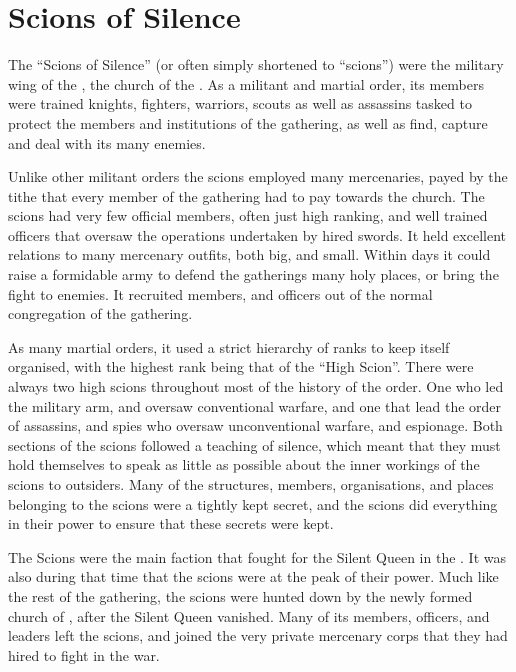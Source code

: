 \section{Scions of Silence}
\label{sec:Scions of Silence}

The ``Scions of Silence'' (or often simply shortened to ``scions'') were the
military wing of the , the church of the
. As a militant and martial order, its members were
trained knights, fighters, warriors, scouts as well as assassins tasked to
protect the members and institutions of the gathering, as well as find,
capture and deal with its many enemies.

Unlike other militant orders the scions employed many mercenaries, payed by
the tithe that every member of the gathering had to pay towards the church.
The scions had very few official members, often just high ranking, and well
trained officers that oversaw the operations undertaken by hired swords. It
held excellent relations to many mercenary outfits, both big, and
small. Within days it could raise a formidable army to defend the gatherings
many holy places, or bring the fight to enemies. It recruited members, and
officers out of the normal congregation of the gathering.

As many martial orders, it used a strict hierarchy of ranks to keep itself
organised, with the highest rank being that of the ``High Scion''. There were
always two high scions throughout most of the history of the order. One who
led the military arm, and oversaw conventional warfare, and one that lead the
order of assassins, and spies who oversaw unconventional warfare, and
espionage. Both sections of the scions followed a teaching of silence, which
meant that they must hold themselves to speak as little as possible about the
inner workings of the scions to outsiders. Many of the structures, members,
organisations, and places belonging to the scions were a tightly kept secret,
and the scions did everything in their power to ensure that these secrets were
kept.

The Scions were the main faction that fought for the Silent Queen in the
. It was also during that time that the scions were
at the peak of their power. Much like the rest of the gathering, the scions
were hunted down by the newly formed church of , after the
Silent Queen vanished. Many of its members, officers, and leaders left the
scions, and joined the very private mercenary corps that they had hired to
fight in the war.

